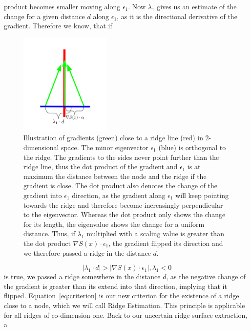 product becomes smaller moving along $\epsilon_1$. Now $\lambda_1$ gives
us an estimate of the change for a given distance $d$ along
$\epsilon_1$, as it is the directional derivative of the gradient.
Therefore we know, that if
\begin{figure}[]
    \centering
    \includegraphics[trim=0 40 0 50, clip=true, width=0.4\textwidth]{Images/criterion.pdf}
    \caption{Illustration of gradients (green) close to a ridge line
    (red) in 2-dimensional space. The minor eigenvector $\epsilon_1$
    (blue) is orthogonal to the ridge. The gradients to the sides never
    point further than the ridge line, thus the dot product of the
    gradient and $\epsilon_1$ is at maximum the distance between the
    node and the ridge if the gradient is close. The dot product also
    denotes the change of the gradient into $\epsilon_1$ direction, as
    the gradient along $\epsilon_1$ will keep pointing towards the ridge
    and therefore become increasingly perpendicular to the eigenvector.
    Whereas the dot product only shows the change for its length, the
    eigenvalue shows the change for a uniform distance. Thus, if
    $\lambda_1$ multiplied with a scaling value is greater than the dot
    product $\nabla S(x) \cdot \epsilon_1$, the gradient flipped its
    direction and we therefore passed a ridge in the distance $d$.}
    \label{fig:criterion}
\end{figure}
\begin{equation}\label{eq:criterion}
    |\lambda_1 \cdot d| > |\nabla S(x) \cdot \epsilon_1|,\lambda_1 < 0
\end{equation}
is true, we passed a ridge somewhere in the distance $d$, as the
negative change of the gradient is greater than its extend into that
direction, implying that it flipped. Equation~\ref{eq:criterion} is our
new criterion for the existence of a ridge close to a node, which we
will call Ridge Estimation. This principle is applicable for all ridges
of co-dimension one. Back to our uncertain ridge surface extraction, a
